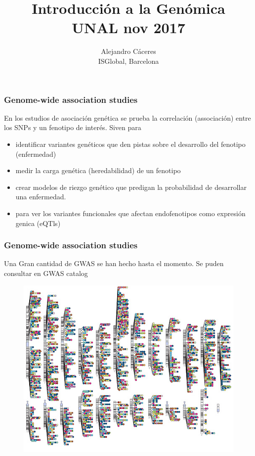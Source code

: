 \documentclass{beamer}\usepackage[]{graphicx}\usepackage[]{color}
\begin{document}
\title{Introducci\'on a la Gen\'omica \\ UNAL nov 2017}
\author{Alejandro C\'aceres \\ ISGlobal, Barcelona}


\maketitle

\begin{frame}[fragile]
\frametitle{Genome-wide association studies}

En los estudios de asociaci\'on gen\'etica se prueba la correlaci\'on (associaci\'on) entre los SNPs y un fenotipo de inter\'es. Siven para

\begin{itemize}
\item identificar variantes gen\'eticos que den pistas sobre el desarrollo del fenotipo (enfermedad)
\item medir la carga gen\'etica (heredabilidad) de un fenotipo
\item crear modelos de riezgo gen\'etico que predigan la probabilidad de desarrollar una enfermedad. 
\item para ver los variantes funcionales que afectan  endofenotipos como expresi\'on genica (eQTls) 
\end{itemize}

\end{frame}


\begin{frame}[fragile]
\frametitle{Genome-wide association studies}
Una Gran cantidad de GWAS se han hecho hasta el momento. Se puden consultar en GWAS catalog
\begin{figure}[htbp]
\begin{center}
\includegraphics[width=.5\linewidth]{gwasw.jpg}
\end{center}
\end{figure}
\end{frame}
\end{document}
